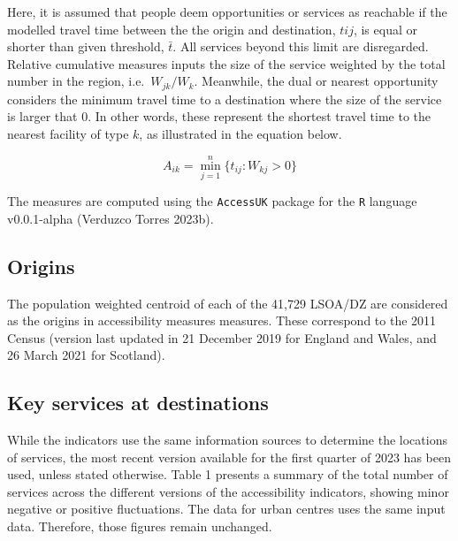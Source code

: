\documentclass{article}
\begin{document}
Here, it is assumed that people deem opportunities or services as
reachable if the modelled travel time between the the origin and
destination, \(t{ij}\), is equal or shorter than given threshold,
\(\bar{t}\). All services beyond this limit are disregarded. Relative
cumulative measures inputs the size of the service weighted by the total
number in the region, i.e.~\(W_{jk} / W_k\). Meanwhile, the dual or
nearest opportunity considers the minimum travel time to a destination
where the size of the service is larger that 0. In other words, these
represent the shortest travel time to the nearest facility of type
\(k\), as illustrated in the equation below.

\[
A_{ik} = \min_{j=1}^{n} \{ t_{ij} : W_{kj} > 0 \}
\]

The measures are computed using the \texttt{AccessUK} package for the
\texttt{R} language v0.0.1-alpha (Verduzco Torres 2023b).

\hypertarget{origins}{%
\subsection{Origins}\label{origins}}

The population weighted centroid of each of the 41,729 LSOA/DZ are
considered as the origins in accessibility measures measures. These
correspond to the 2011 Census (version last updated in 21 December 2019
for England and Wales, and 26 March 2021 for Scotland).

\hypertarget{key-services-at-destinations}{%
\subsection{Key services at
destinations}\label{key-services-at-destinations}}

While the indicators use the same information sources to determine the
locations of services, the most recent version available for the first
quarter of 2023 has been used, unless stated otherwise. Table 1 presents
a summary of the total number of services across the different versions
of the accessibility indicators, showing minor negative or positive
fluctuations. The data for urban centres uses the same input data.
Therefore, those figures remain unchanged.
\end{document}
